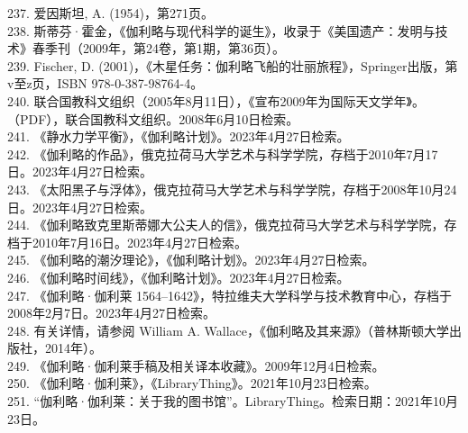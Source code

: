 237. 爱因斯坦, A. (1954)，第271页。\\
238. 斯蒂芬·霍金，《伽利略与现代科学的诞生》，收录于《美国遗产：发明与技术》春季刊（2009年，第24卷，第1期，第36页）。\\
239. Fischer, D. (2001)，《木星任务：伽利略飞船的壮丽旅程》，Springer出版，第v至z页，ISBN 978-0-387-98764-4。\\
240. 联合国教科文组织（2005年8月11日），《宣布2009年为国际天文学年》。（PDF），联合国教科文组织。2008年6月10日检索。\\
241. 《静水力学平衡》，《伽利略计划》。2023年4月27日检索。\\
242. 《伽利略的作品》，俄克拉荷马大学艺术与科学学院，存档于2010年7月17日。2023年4月27日检索。\\
243. 《太阳黑子与浮体》，俄克拉荷马大学艺术与科学学院，存档于2008年10月24日。2023年4月27日检索。\\
244. 《伽利略致克里斯蒂娜大公夫人的信》，俄克拉荷马大学艺术与科学学院，存档于2010年7月16日。2023年4月27日检索。\\
245. 《伽利略的潮汐理论》，《伽利略计划》。2023年4月27日检索。\\
246. 《伽利略时间线》，《伽利略计划》。2023年4月27日检索。\\
247. 《伽利略·伽利莱 1564–1642》，特拉维夫大学科学与技术教育中心，存档于2008年2月7日。2023年4月27日检索。\\
248. 有关详情，请参阅 William A. Wallace，《伽利略及其来源》（普林斯顿大学出版社，2014年）。\\
249. 《伽利略·伽利莱手稿及相关译本收藏》。2009年12月4日检索。\\
250. 《伽利略·伽利莱》，《LibraryThing》。2021年10月23日检索。\\
251. “伽利略·伽利莱：关于我的图书馆”。LibraryThing。检索日期：2021年10月23日。
